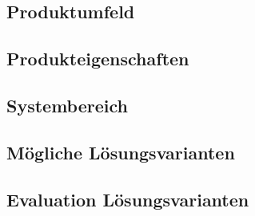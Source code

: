 \subsection{Produktumfeld}
\clearpage
\subsection{Produkteigenschaften}
\clearpage
\subsection{Systembereich}
\clearpage
\subsection{M\"ogliche L\"osungsvarianten}
\clearpage
\subsection{Evaluation L\"osungsvarianten}
